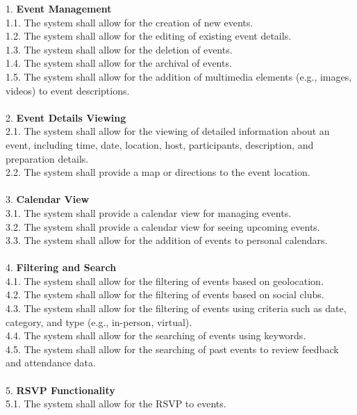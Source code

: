 \documentclass[a4paper,12pt]{article}
\begin{document}
1. \textbf{Event Management}\\
    1.1. The system shall allow for the creation of new events.\\
    1.2. The system shall allow for the editing of existing event details.\\
    1.3. The system shall allow for the deletion of events.\\
    1.4. The system shall allow for the archival of events.\\
    1.5. The system shall allow for the addition of multimedia elements (e.g., images, videos) to event descriptions.\\\\
2. \textbf{Event Details Viewing}\\
    2.1. The system shall allow for the viewing of detailed information about an event, including time, date, 
    location, host, participants, description, and preparation details.\\
    2.2. The system shall provide a map or directions to the event location.\\\\
3. \textbf{Calendar View}\\
    3.1. The system shall provide a calendar view for managing events.\\
    3.2. The system shall provide a calendar view for seeing upcoming events.\\
    3.3. The system shall allow for the addition of events to personal calendars.\\\\
4. \textbf{Filtering and Search}\\
    4.1. The system shall allow for the filtering of events based on geolocation.\\
    4.2. The system shall allow for the filtering of events based on social clubs.\\
    4.3. The system shall allow for the filtering of events using criteria such as date, category, and type (e.g., in-person, virtual).\\
    4.4. The system shall allow for the searching of events using keywords.\\
    4.5. The system shall allow for the searching of past events to review feedback and attendance data.\\\\
5. \textbf{RSVP Functionality}\\
    5.1. The system shall allow for the RSVP to events.\\
\end{document}
